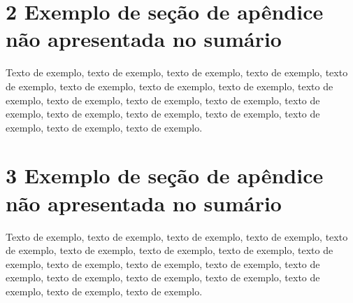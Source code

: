 \documentclass[
	12pt,				%
	oneside,			%
	a4paper,			%
	english,			%
	brazil				%
	]{abntex2ppgsi}
\begin{document}
\begin{apendicesenv}
\section*{2 Exemplo de seção de apêndice não apresentada no sumário}

Texto de exemplo, texto de exemplo, texto de exemplo, texto de exemplo, texto de exemplo, texto de exemplo, texto de exemplo, texto de exemplo, texto de exemplo, texto de exemplo, texto de exemplo, texto de exemplo, texto de exemplo, texto de exemplo, texto de exemplo, texto de exemplo, texto de exemplo, texto de exemplo, texto de exemplo.

\section*{3 Exemplo de seção de apêndice não apresentada no sumário}

Texto de exemplo, texto de exemplo, texto de exemplo, texto de exemplo, texto de exemplo, texto de exemplo, texto de exemplo, texto de exemplo, texto de exemplo, texto de exemplo, texto de exemplo, texto de exemplo, texto de exemplo, texto de exemplo, texto de exemplo, texto de exemplo, texto de exemplo, texto de exemplo, texto de exemplo.

\end{apendicesenv}


\end{document}

